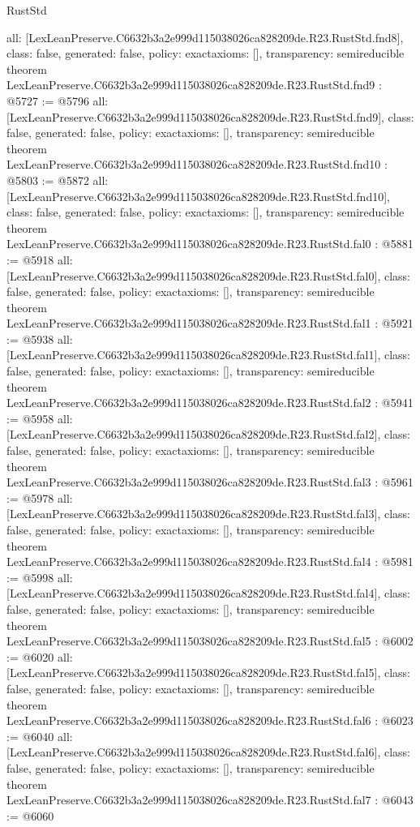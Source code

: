 \begin{lexlean}{RustStd}
\begin{coremodule}
{  all: [LexLeanPreserve.C6632b3a2e999d115038026ca828209de.R23.RustStd.fnd8],
  class: false,
  generated: false,
  policy: exact{axioms: []},
  transparency: semireducible
}
theorem LexLeanPreserve.C6632b3a2e999d115038026ca828209de.R23.RustStd.fnd9 : @5727 := @5796 {
  all: [LexLeanPreserve.C6632b3a2e999d115038026ca828209de.R23.RustStd.fnd9],
  class: false,
  generated: false,
  policy: exact{axioms: []},
  transparency: semireducible
}
theorem LexLeanPreserve.C6632b3a2e999d115038026ca828209de.R23.RustStd.fnd10 : @5803 := @5872 {
  all: [LexLeanPreserve.C6632b3a2e999d115038026ca828209de.R23.RustStd.fnd10],
  class: false,
  generated: false,
  policy: exact{axioms: []},
  transparency: semireducible
}
theorem LexLeanPreserve.C6632b3a2e999d115038026ca828209de.R23.RustStd.fal0 : @5881 := @5918 {
  all: [LexLeanPreserve.C6632b3a2e999d115038026ca828209de.R23.RustStd.fal0],
  class: false,
  generated: false,
  policy: exact{axioms: []},
  transparency: semireducible
}
theorem LexLeanPreserve.C6632b3a2e999d115038026ca828209de.R23.RustStd.fal1 : @5921 := @5938 {
  all: [LexLeanPreserve.C6632b3a2e999d115038026ca828209de.R23.RustStd.fal1],
  class: false,
  generated: false,
  policy: exact{axioms: []},
  transparency: semireducible
}
theorem LexLeanPreserve.C6632b3a2e999d115038026ca828209de.R23.RustStd.fal2 : @5941 := @5958 {
  all: [LexLeanPreserve.C6632b3a2e999d115038026ca828209de.R23.RustStd.fal2],
  class: false,
  generated: false,
  policy: exact{axioms: []},
  transparency: semireducible
}
theorem LexLeanPreserve.C6632b3a2e999d115038026ca828209de.R23.RustStd.fal3 : @5961 := @5978 {
  all: [LexLeanPreserve.C6632b3a2e999d115038026ca828209de.R23.RustStd.fal3],
  class: false,
  generated: false,
  policy: exact{axioms: []},
  transparency: semireducible
}
theorem LexLeanPreserve.C6632b3a2e999d115038026ca828209de.R23.RustStd.fal4 : @5981 := @5998 {
  all: [LexLeanPreserve.C6632b3a2e999d115038026ca828209de.R23.RustStd.fal4],
  class: false,
  generated: false,
  policy: exact{axioms: []},
  transparency: semireducible
}
theorem LexLeanPreserve.C6632b3a2e999d115038026ca828209de.R23.RustStd.fal5 : @6002 := @6020 {
  all: [LexLeanPreserve.C6632b3a2e999d115038026ca828209de.R23.RustStd.fal5],
  class: false,
  generated: false,
  policy: exact{axioms: []},
  transparency: semireducible
}
theorem LexLeanPreserve.C6632b3a2e999d115038026ca828209de.R23.RustStd.fal6 : @6023 := @6040 {
  all: [LexLeanPreserve.C6632b3a2e999d115038026ca828209de.R23.RustStd.fal6],
  class: false,
  generated: false,
  policy: exact{axioms: []},
  transparency: semireducible
}
theorem LexLeanPreserve.C6632b3a2e999d115038026ca828209de.R23.RustStd.fal7 : @6043 := @6060 {
}
\end{coremodule}
\end{lexlean}
